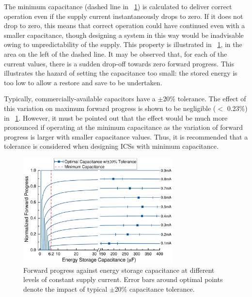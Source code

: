 The minimum capacitance (dashed line in \figurename{~\ref{fig:fpwconstcurr}}) is calculated to deliver correct operation even if the supply current instantaneously drops to zero. If it does not drop to zero, this means that correct operation could have continued even with a smaller capacitance, though designing a system in this way would be inadvisable owing to unpredictability of the supply. This property is illustrated in \figurename{~\ref{fig:fpwconstcurr}}, in the area on the left of the dashed line. It may be observed that, for each of the current values, there is a sudden drop-off towards zero forward progress. This illustrates the hazard of setting the capacitance too small: the stored energy is too low to allow a restore and save to be undertaken.
 
Typically, commercially-available capacitors have a $\pm$20\% tolerance. The effect of this variation on maximum forward progress is shown to be negligible ($<$ 0.23\%) in \figurename{~\ref{fig:fpwconstcurr}}. However, it must be pointed out that the effect would be much more pronounced if operating at the minimum capacitance as the variation of forward progress is larger with smaller capacitance values. Thus, it is recommended that a tolerance is considered when designing ICSs with minimum capacitance.



\begin{figure}[!t]
  \centering
  \includegraphics[width=3.2in]{ch3_sizingeffect/figures/StorCCur6Fig} 
  \caption{Forward progress against energy storage capacitance at different levels of constant supply current. Error bars around optimal points denote the impact of typical $\pm$20\% capacitance tolerance. }
  \label{fig:fpwconstcurr}
\end{figure}

